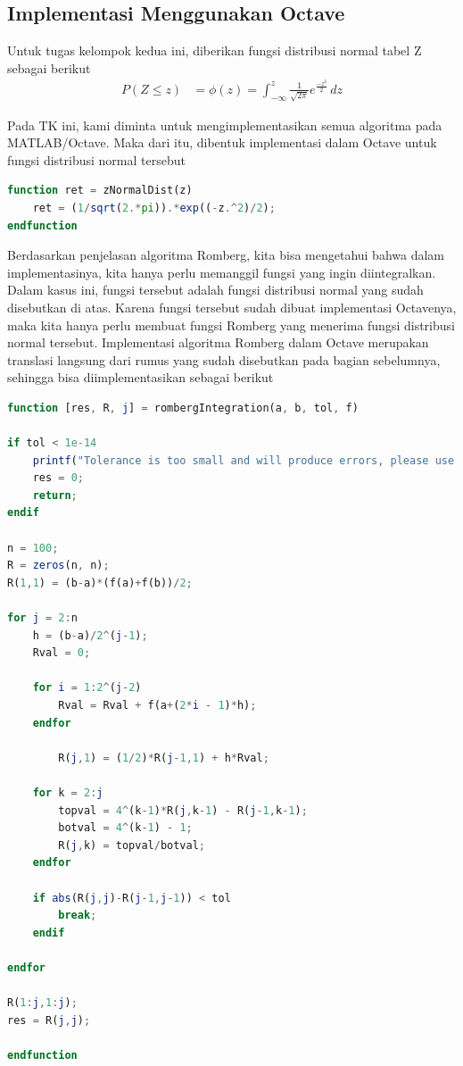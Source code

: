 \documentclass[journal,12pt,onecolumn,a4paper]{IEEEtran}
\begin{document}
\subsection{Implementasi Menggunakan Octave}

\par Untuk tugas kelompok kedua ini, diberikan fungsi distribusi normal tabel Z sebagai berikut
\begin{equation*}
	\begin{split}
		P(Z \le z ) & = \phi(z) = \int_{-\infty}^{z} \frac{1}{\sqrt{2\pi}}e ^{\frac{-z^2}{2}} \,dz
	\end{split}
\end{equation*}

Pada TK ini, kami diminta untuk mengimplementasikan semua algoritma pada MATLAB/Octave. Maka dari itu, dibentuk implementasi dalam Octave untuk fungsi distribusi normal tersebut

\begin{center}
	\begin{lstlisting}[language=Octave]
function ret = zNormalDist(z)
	ret = (1/sqrt(2.*pi)).*exp((-z.^2)/2);
endfunction
	\end{lstlisting}
\end{center}

Berdasarkan penjelasan algoritma Romberg, kita bisa mengetahui bahwa dalam implementasinya, kita hanya perlu memanggil fungsi yang ingin diintegralkan. Dalam kasus ini, fungsi tersebut adalah fungsi distribusi normal yang sudah disebutkan di atas. Karena fungsi tersebut sudah dibuat implementasi Octavenya, maka kita hanya perlu membuat fungsi Romberg yang menerima fungsi distribusi normal tersebut. Implementasi algoritma Romberg dalam Octave merupakan translasi langsung dari rumus yang sudah disebutkan pada bagian sebelumnya, sehingga bisa diimplementasikan sebagai berikut
\begin{center}
	\begin{lstlisting}[language=Octave]
function [res, R, j] = rombergIntegration(a, b, tol, f)

if tol < 1e-14
	printf("Tolerance is too small and will produce errors, please use larger values\n")
	res = 0;
	return;
endif

n = 100;
R = zeros(n, n);
R(1,1) = (b-a)*(f(a)+f(b))/2;

for j = 2:n
	h = (b-a)/2^(j-1);
	Rval = 0;

	for i = 1:2^(j-2)
		Rval = Rval + f(a+(2*i - 1)*h);
	endfor

		R(j,1) = (1/2)*R(j-1,1) + h*Rval;

	for k = 2:j
		topval = 4^(k-1)*R(j,k-1) - R(j-1,k-1);
		botval = 4^(k-1) - 1;
		R(j,k) = topval/botval;
	endfor

	if abs(R(j,j)-R(j-1,j-1)) < tol
		break;
	endif

endfor

R(1:j,1:j);
res = R(j,j);

endfunction
	\end{lstlisting}
\end{center}
\end{document}
